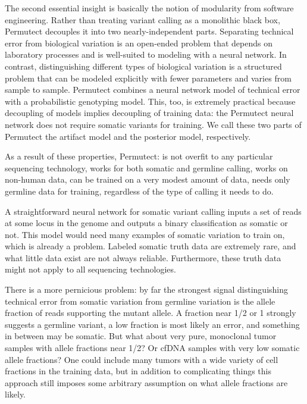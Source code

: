 \documentclass[times, twoside, watermark]{StyleBioRxiv}
\begin{document}
The second essential insight is basically the notion of modularity from software engineering.  Rather than treating variant calling as a monolithic black box, Permutect decouples it into two nearly-independent parts.  Separating technical error from biological variation is an open-ended problem that depends on laboratory processes and is well-suited to modeling with a neural network.  In contrast, distinguishing different types of biological variation is a structured problem that can be modeled explicitly with fewer parameters and varies from sample to sample.  Permutect combines a neural network model of technical error with a probabilistic genotyping model.  This, too, is extremely practical because decoupling of models implies decoupling of training data: the Permutect neural network does not require somatic variants for training.  We call these two parts of Permutect the artifact model and the posterior model, respectively.

As a result of these properties, Permutect: is not overfit to any particular sequencing technology, works for both somatic and germline calling, works on non-human data, can be trained on a very modest amount of data, needs only germline data for training, regardless of the type of calling it needs to do.

A straightforward neural network for somatic variant calling inputs a set of reads at some locus in the genome and outputs a binary classification as somatic or not.  This model would need many examples of somatic variation to train on, which is already a problem.  Labeled somatic truth data are extremely rare, and what little data exist are not always reliable.  Furthermore, these truth data might not apply to all sequencing technologies.

There is a more pernicious problem: by far the strongest signal distinguishing technical error from somatic variation from germline variation is the allele fraction of reads supporting the mutant allele.  A fraction near 1/2 or 1 strongly suggests a germline variant, a low fraction is most likely an error, and something in between may be somatic.  But what about very pure, monoclonal tumor samples with allele fractions near 1/2?  Or cfDNA samples with very low somatic allele fractions?  One could include many tumors with a wide variety of cell fractions in the training data, but in addition to complicating things this approach still imposes some arbitrary assumption on what allele fractions are likely.
\end{document}

